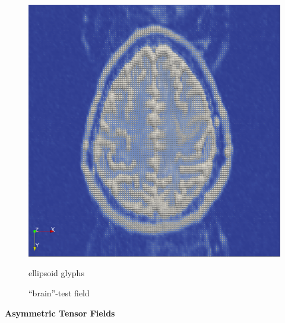 \documentclass{scrartcl}
\begin{document}
\begin{figure}[!t]
\begin{minipage}{0.4\textwidth}
    \includegraphics[width=\textwidth]{img/brain_ellipsoid_glyphs.png}
    \label{b)}
    \caption*{ellipsoid glyphs}
  \end{minipage}
\caption{``brain''-test field}
\label{brainglyphs}
\end{figure}


\textbf{Asymmetric Tensor Fields}
\end{document}
